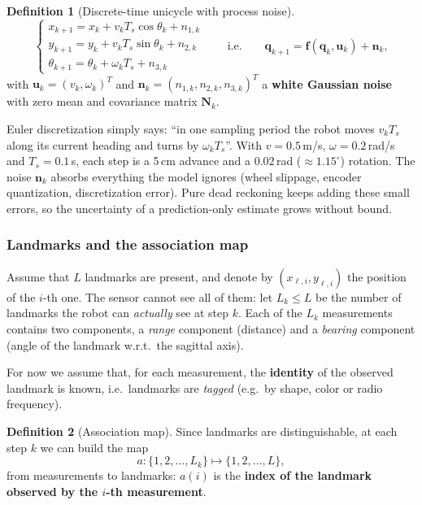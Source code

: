 \documentclass[11pt,a4paper]{article}
\theoremstyle{definition}
\newtheorem{definition}{Definition}[section]
\theoremstyle{plain}
\theoremstyle{remark}
\begin{document}
\begin{definition}[Discrete-time unicycle with process noise]
\label{def:process}
\[
\begin{cases}
x_{k+1}=x_k+v_k T_s\cos\theta_k+n_{1,k}\\
y_{k+1}=y_k+v_k T_s\sin\theta_k+n_{2,k}\\
\theta_{k+1}=\theta_k+\omega_k T_s+n_{3,k}
\end{cases}
\qquad\text{i.e.}\qquad
\bm q_{k+1}=\bm f(\bm q_k,\bm u_k)+\bm n_k ,
\]
with $\bm u_k=(v_k,\omega_k)^T$ and $\bm n_k=(n_{1,k},n_{2,k},n_{3,k})^T$ a \textbf{white Gaussian noise} with zero mean and covariance matrix $\bm N_k$.
\end{definition}

\begin{intuition}
Euler discretization simply says: ``in one sampling period the robot moves $v_kT_s$ along its current heading and turns by $\omega_kT_s$''. With $v=0.5$\,m/s, $\omega=0.2$\,rad/s and $T_s=0.1$\,s, each step is a 5\,cm advance and a $0.02$\,rad ($\approx1.15^\circ$) rotation. The noise $\bm n_k$ absorbs everything the model ignores (wheel slippage, encoder quantization, discretization error). Pure dead reckoning keeps adding these small errors, so the uncertainty of a prediction-only estimate grows without bound.
\end{intuition}

\subsubsection*{Landmarks and the association map}
Assume that $L$ landmarks are present, and denote by $(x_{\ell,i},y_{\ell,i})$ the position of the $i$-th one. The sensor cannot see all of them: let $L_k\le L$ be the number of landmarks the robot can \emph{actually} see at step $k$. Each of the $L_k$ measurements contains two components, a \emph{range} component (distance) and a \emph{bearing} component (angle of the landmark w.r.t.\ the sagittal axis).

For now we assume that, for each measurement, the \textbf{identity} of the observed landmark is known, i.e.\ landmarks are \emph{tagged} (e.g.\ by shape, color or radio frequency).

\begin{definition}[Association map]
\label{def:assoc}
Since landmarks are distinguishable, at each step $k$ we can build the map
\[
a:\{1,2,\dots,L_k\}\longmapsto\{1,2,\dots,L\},
\]
from measurements to landmarks: $a(i)$ is the \textbf{index of the landmark observed by the $i$-th measurement}.
\end{definition}
\end{document}
